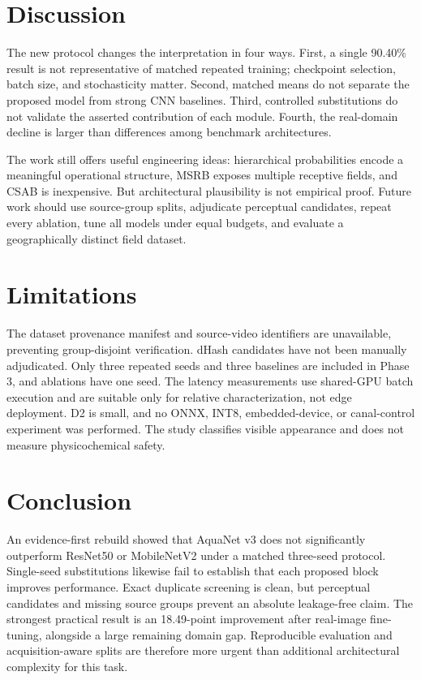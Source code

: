 \documentclass[journal]{IEEEtran}
\begin{document}
\section{Discussion}
The new protocol changes the interpretation in four ways. First, a single 90.40\% result is not representative of matched repeated training; checkpoint selection, batch size, and stochasticity matter. Second, matched means do not separate the proposed model from strong CNN baselines. Third, controlled substitutions do not validate the asserted contribution of each module. Fourth, the real-domain decline is larger than differences among benchmark architectures.

The work still offers useful engineering ideas: hierarchical probabilities encode a meaningful operational structure, MSRB exposes multiple receptive fields, and CSAB is inexpensive. But architectural plausibility is not empirical proof. Future work should use source-group splits, adjudicate perceptual candidates, repeat every ablation, tune all models under equal budgets, and evaluate a geographically distinct field dataset.

\section{Limitations}
The dataset provenance manifest and source-video identifiers are unavailable, preventing group-disjoint verification. dHash candidates have not been manually adjudicated. Only three repeated seeds and three baselines are included in Phase 3, and ablations have one seed. The latency measurements use shared-GPU batch execution and are suitable only for relative characterization, not edge deployment. D2 is small, and no ONNX, INT8, embedded-device, or canal-control experiment was performed. The study classifies visible appearance and does not measure physicochemical safety.

\section{Conclusion}
An evidence-first rebuild showed that AquaNet v3 does not significantly outperform ResNet50 or MobileNetV2 under a matched three-seed protocol. Single-seed substitutions likewise fail to establish that each proposed block improves performance. Exact duplicate screening is clean, but perceptual candidates and missing source groups prevent an absolute leakage-free claim. The strongest practical result is an 18.49-point improvement after real-image fine-tuning, alongside a large remaining domain gap. Reproducible evaluation and acquisition-aware splits are therefore more urgent than additional architectural complexity for this task.



\end{document}
